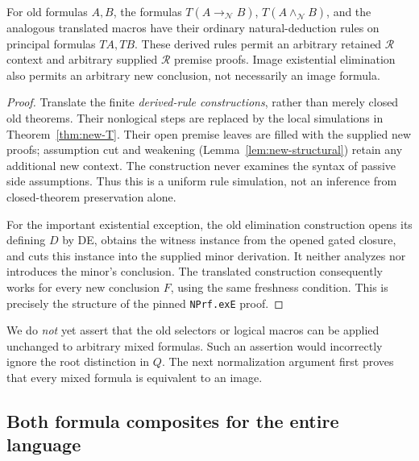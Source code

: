 \begin{lemma}
\label{lem:new-image-logic}
For old formulas $A,B$, the formulas
$T(A\to_{\mathcal N}B)$, $T(A\wedge_{\mathcal N}B)$, and the analogous
translated macros have their ordinary natural-deduction rules on principal
formulas $TA,TB$.  These derived rules permit an arbitrary retained
$\mathcal R$ context and arbitrary supplied $\mathcal R$ premise proofs.
Image existential elimination also permits an arbitrary new conclusion,
not necessarily an image formula.
\end{lemma}
\begin{proof}
Translate the finite \emph{derived-rule constructions}, rather than merely
closed old theorems.  Their nonlogical steps are replaced by the local
simulations in Theorem~\ref{thm:new-T}.  Their open premise leaves are filled
with the supplied new proofs; assumption cut and weakening
(Lemma~\ref{lem:new-structural}) retain any additional new context.  The
construction never examines the syntax of passive side assumptions.
Thus this is a uniform rule simulation, not an inference from
closed-theorem preservation alone.

For the important existential exception, the old elimination construction
opens its defining $D$ by DE, obtains the witness instance from the opened
gated closure, and cuts this instance into the supplied minor derivation.
It neither analyzes nor introduces the minor's conclusion.  The translated
construction consequently works for every new conclusion $F$, using the
same freshness condition.  This is precisely the structure of the pinned
\texttt{NPrf.exE} proof.
\end{proof}

We do \emph{not} yet assert that the old selectors or logical macros can be
applied unchanged to arbitrary mixed formulas.  Such an assertion would
incorrectly ignore the root distinction in $Q$.  The next normalization
argument first proves that every mixed formula is equivalent to an image.

\subsection{Both formula composites for the entire language}
\label{subsec:new-composites}


